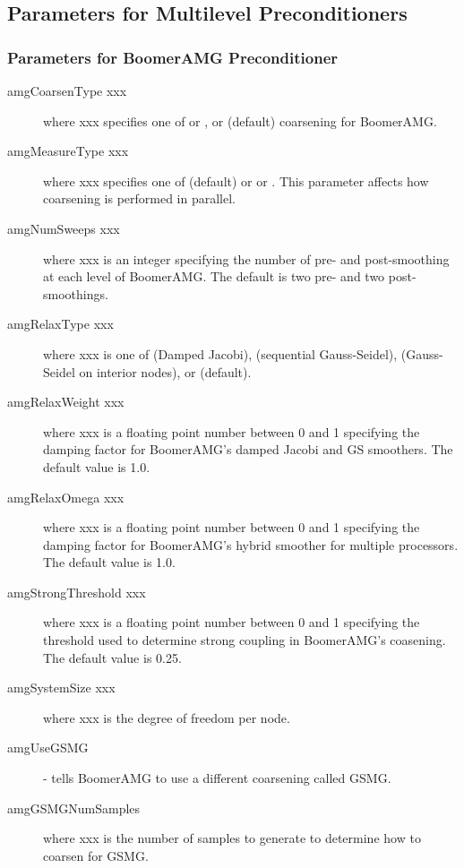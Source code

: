 \subsection{Parameters for Multilevel Preconditioners}
                                                                                
\subsubsection{Parameters for BoomerAMG Preconditioner}
\begin{description}
\item[amgCoarsenType xxx] where xxx specifies one of  or
     , or  (default) coarsening for BoomerAMG.
\item[amgMeasureType xxx] where xxx specifies one of  (default)
     or or .  This parameter affects how coarsening is performed
     in parallel.
\item[amgNumSweeps xxx] where xxx is an integer specifying the number of
     pre- and post-smoothing at each level of BoomerAMG.
     The default is two pre- and two post-smoothings.
\item[amgRelaxType xxx] where xxx is one of  (Damped Jacobi),
      (sequential Gauss-Seidel),  (Gauss-Seidel
     on interior nodes), or  (default).
\item[amgRelaxWeight xxx] where xxx is a floating point number between
     0 and 1 specifying the damping factor for BoomerAMG's damped
     Jacobi and GS smoothers.  The default value is 1.0.
\item[amgRelaxOmega xxx] where xxx is a floating point number between
     0 and 1 specifying the damping factor for BoomerAMG's hybrid
     smoother for multiple processors.  The default value is 1.0.
\item[amgStrongThreshold xxx] where xxx is a floating point number between 0
     and 1 specifying the threshold used to determine
     strong coupling in BoomerAMG's coasening.  The default value is 0.25.
\item[amgSystemSize xxx] where xxx is the degree of freedom per node.
\item[amgUseGSMG] - tells BoomerAMG to use a different coarsening called GSMG.
\item[amgGSMGNumSamples] where xxx is the number of samples to generate
           to determine how to coarsen for GSMG.
\end{description}
                                                                                
